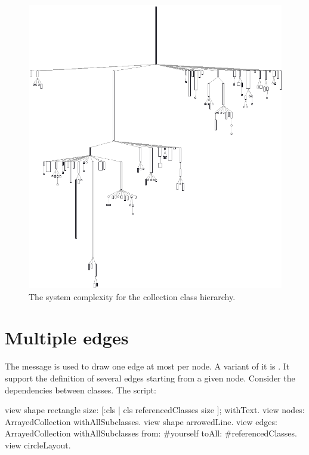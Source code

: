 \documentclass[a4paper,10pt,twoside]{book}
\begin{document}
\begin{figure}[htbp]
\centerline{\includegraphics[width=\linewidth]{picture5}}
\caption{The system complexity for the collection class hierarchy.}
\label{fig:picture5}
\end{figure}


\section{Multiple edges}

The message  is used to draw one edge at most per node. A variant of it is . It support the definition of several edges starting from a given node. Consider the dependencies between classes. The script: 

\begin{code}{}
view shape rectangle
	size: [:cls | cls referencedClasses size ];
	withText.
view nodes: ArrayedCollection withAllSubclasses.
view shape arrowedLine.
view 
	edges: ArrayedCollection withAllSubclasses from: #yourself toAll: #referencedClasses.
view circleLayout.
\end{code}
\end{document}
